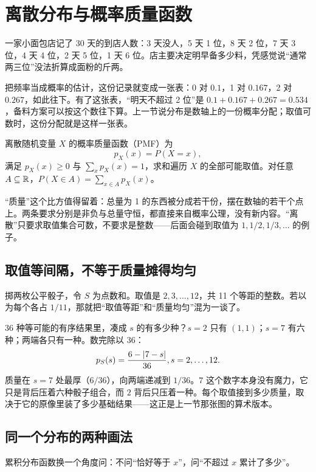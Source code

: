 \section{离散分布与概率质量函数}
\label{sec:05-Probability/03-Random-Variables/02}

一家小面包店记了 30 天的到店人数：3 天没人，5 天 1 位，8 天 2 位，7 天 3 位，4 天 4 位，2 天 5 位，1 天 6 位。店主要决定明早备多少料，凭感觉说``通常两三位''没法折算成面粉的斤两。

把频率当成概率的估计，这份记录就变成一张表：0 对 \(0.1\)，1 对 \(0.167\)，2 对 \(0.267\)，如此往下。有了这张表，``明天不超过 2 位''是 \(0.1+0.167+0.267=0.534\)，备料方案可以按这个数往下算。上一节说分布是数轴上的一份概率分配；取值可数时，这份分配就是这样一张表。

\begin{definition}
离散随机变量 \(X\) 的概率质量函数（PMF）为
\[
p_X(x)=P(X=x),
\]
满足 \(p_X(x)\ge0\) 与 \(\sum_x p_X(x)=1\)，求和遍历 \(X\) 的全部可能取值。对任意 \(A\subseteq\mathbb{R}\)，\(P(X\in A)=\sum_{x\in A}p_X(x)\)。
\end{definition}

``质量''这个比方值得留着：总量为 1 的东西被分成若干份，摆在数轴的若干个点上。两条要求分别是非负与总量守恒，都直接来自概率公理，没有新内容。``离散''只要求取值集合可数，不要求是整数——后面会碰到取值为 \(1,1/2,1/3,\ldots\) 的例子。

\subsection{取值等间隔，不等于质量摊得均匀}

掷两枚公平骰子，令 \(S\) 为点数和。取值是 \(2,3,\ldots,12\)，共 11 个等距的整数。若以为每个各占 \(1/11\)，那就把``取值等距''和``质量均匀''混为一谈了。

36 种等可能的有序结果里，凑成 \(s\) 的有多少种？\(s=2\) 只有 \((1,1)\)；\(s=7\) 有六种；两端各只有一种。数完除以 36：
\[
p_S(s)=\frac{6-\left|7-s\right|}{36},\space s=2,\ldots,12.
\]
质量在 \(s=7\) 处最厚（\(6/36\)），向两端递减到 \(1/36\)。\(7\) 这个数字本身没有魔力，它只是背后压着六种骰子组合，而 \(2\) 背后只压着一种。每个取值接到多少质量，取决于它的原像里装了多少基础结果——这正是上一节那张图的算术版本。

\subsection{同一个分布的两种画法}

累积分布函数换一个角度问：不问``恰好等于 \(x\)''，问``不超过 \(x\) 累计了多少''。

